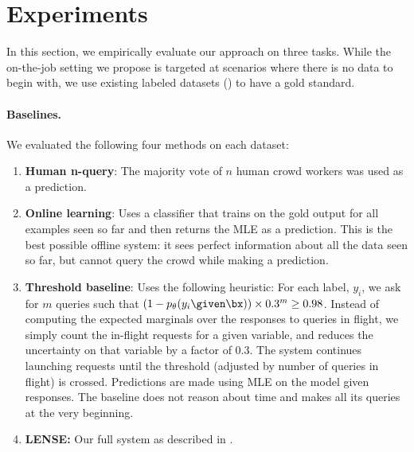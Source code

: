 \section{Experiments}
\label{sec:experiments}


In this section, we empirically evaluate our approach on three tasks. 
While the on-the-job setting we propose is targeted at scenarios where there is
no data to begin with, we use existing labeled datasets () to have a gold standard.

\paragraph{Baselines.}
We evaluated the following four methods on each dataset:
\begin{enumerate}
  \item {\bf Human n-query}: The majority vote of $n$ human crowd workers was used as a prediction.
  \item {\bf Online learning}:
    Uses a classifier that trains on the gold output for all examples seen so
    far and then returns the MLE as a prediction.
    This is the best possible offline system: it sees perfect information about all the data seen so far, but cannot query the crowd while making a prediction.
  \item {\bf Threshold baseline}: Uses the following heuristic:
    For each label, $y_i$, we ask for $m$ queries such that $(1 - \p(y_i\given \bx))\times 0.3^m \ge 0.98$. %
    Instead of computing the expected marginals over the responses to queries in flight,
    we simply count the in-flight requests for a given variable, and reduces
    the uncertainty on that variable by a factor of $0.3$. The system continues
    launching requests until the threshold (adjusted by number of queries in
    flight) is crossed. Predictions are made using MLE on the model given
    responses.
    The baseline does not reason about time and makes all its queries at the very beginning.
  \item {\bf LENSE:} Our full system as described in .
\end{enumerate}

